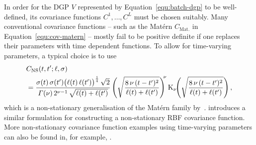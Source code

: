 In order for the DGP $V$ represented by Equation~\eqref{equ:batch-dgp} to be well-defined, its covariance functions $C^1,\ldots, C^L$ must be chosen suitably. Many conventional covariance functions -- such as the Mat\'{e}rn $C_{\mathrm{Mat.}}$ in Equation~\eqref{equ:cov-matern} -- mostly fail to be positive definite if one replaces their parameters with time dependent functions. To allow for time-varying parameters, a typical choice is to use
%
\begin{equation}
	\begin{split}
		&C_{\mathrm{NS}}(t, t'; \ell, \sigma) \\
		&= \frac{\sigma(t) \, \sigma(t') \big(\ell(t) \, \ell(t')\big)^{\frac{1}{4}} \, \sqrt{2}}{\varGamma(\nu) \, 2^{\nu-1} \, \sqrt{\ell(t) + \ell(t')}} \left(\sqrt{\frac{8 \, \nu \, (t-t')^2}{\ell(t) + \ell(t')}}\right)^{\!\!\nu} \operatorname{K}_\nu\!\!\left(\sqrt{\frac{8 \, \nu \, (t-t')^2}{\ell(t) + \ell(t')}}\right),
		\label{equ:cov-ns-matern}
	\end{split}
\end{equation}
%
which is a non-stationary generalisation of the Mat\'{e}rn family by~\citet{Paciorek2004, Paciorek2006}. \citet{Gibbs} introduces a similar formulation for constructing a non-stationary RBF covariance function. More non-stationary covariance function examples using time-varying parameters can also be found in, for example, \citet{Higdon1999non, Snoek2014, Remes2017}.

